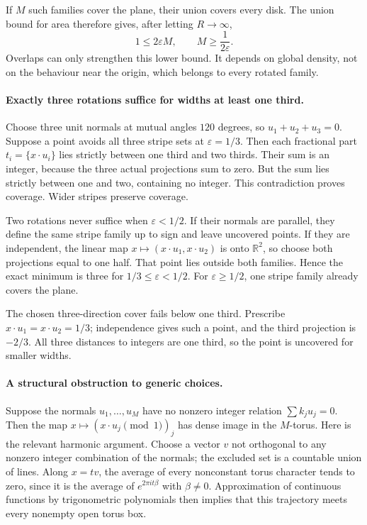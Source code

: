 \documentclass[11pt,a4paper]{article}
\newcommand{\R}{\mathbb{R}}
\begin{document}
If $M$ such families cover the plane, their union covers every disk. The union bound for area therefore gives, after letting $R\to\infty$,
\[
 1\leq2\varepsilon M,\qquad M\geq\frac1{2\varepsilon}.
\]
Overlaps can only strengthen this lower bound. It depends on global density, not on the behaviour near the origin, which belongs to every rotated family.

\paragraph{Exactly three rotations suffice for widths at least one third.}
Choose three unit normals at mutual angles $120$ degrees, so $u_1+u_2+u_3=0$. Suppose a point avoids all three stripe sets at $\varepsilon=1/3$. Then each fractional part $t_i=\{x\cdot u_i\}$ lies strictly between one third and two thirds. Their sum is an integer, because the three actual projections sum to zero. But the sum lies strictly between one and two, containing no integer. This contradiction proves coverage. Wider stripes preserve coverage.

Two rotations never suffice when $\varepsilon<1/2$. If their normals are parallel, they define the same stripe family up to sign and leave uncovered points. If they are independent, the linear map $x\mapsto(x\cdot u_1,x\cdot u_2)$ is onto $\R^2$, so choose both projections equal to one half. That point lies outside both families. Hence the exact minimum is three for $1/3\leq\varepsilon<1/2$. For $\varepsilon\geq1/2$, one stripe family already covers the plane.

The chosen three-direction cover fails below one third. Prescribe $x\cdot u_1=x\cdot u_2=1/3$; independence gives such a point, and the third projection is $-2/3$. All three distances to integers are one third, so the point is uncovered for smaller widths.

\paragraph{A structural obstruction to generic choices.}
Suppose the normals $u_1,\ldots,u_M$ have no nonzero integer relation $\sum k_ju_j=0$. Then the map $x\mapsto(x\cdot u_j\pmod1)_j$ has dense image in the $M$-torus. Here is the relevant harmonic argument. Choose a vector $v$ not orthogonal to any nonzero integer combination of the normals; the excluded set is a countable union of lines. Along $x=tv$, the average of every nonconstant torus character tends to zero, since it is the average of $e^{2\pi it\beta}$ with $\beta\ne0$. Approximation of continuous functions by trigonometric polynomials then implies that this trajectory meets every nonempty open torus box.
\end{document}
